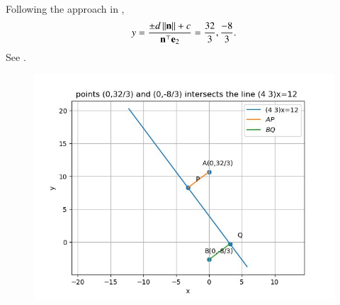 Following the approach in ,
\begin{align}
		y = \frac{\pm d\left\lVert\mathbf{n}\right\rVert+c}{\mathbf{n}^\top\mathbf{e}_{2}}
= \frac{32}{3}, \frac{-8}{3}.
\end{align}
See 
		.
\begin{figure}[h]
\centering
\includegraphics[width=\columnwidth]{chapters/11/10/4/4/figs/fig.png}
\caption{}
		\label{fig:chapters/11/10/4/4/Figure}
\end{figure}
